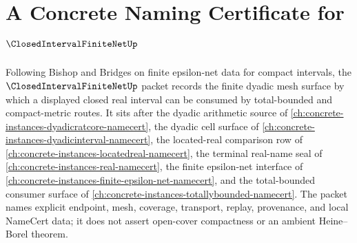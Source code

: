 \chapter{A Concrete Naming Certificate for $\ClosedIntervalFiniteNetUp$}
\label{ch:concrete-instances-closed-interval-finite-net-namecert}

Following Bishop and Bridges on finite epsilon-net data for compact intervals, the $\ClosedIntervalFiniteNetUp$ packet records the finite dyadic mesh surface by which a displayed closed real interval can be consumed by total-bounded and compact-metric routes. It sits after the dyadic arithmetic source of \autoref{ch:concrete-instances-dyadicratcore-namecert}, the dyadic cell surface of \autoref{ch:concrete-instances-dyadicinterval-namecert}, the located-real comparison row of \autoref{ch:concrete-instances-locatedreal-namecert}, the terminal real-name seal of \autoref{ch:concrete-instances-real-namecert}, the finite epsilon-net interface of \autoref{ch:concrete-instances-finite-epsilon-net-namecert}, and the total-bounded consumer surface of \autoref{ch:concrete-instances-totallybounded-namecert}. The packet names explicit endpoint, mesh, coverage, transport, replay, provenance, and local NameCert data; it does not assert open-cover compactness or an ambient Heine--Borel theorem.

